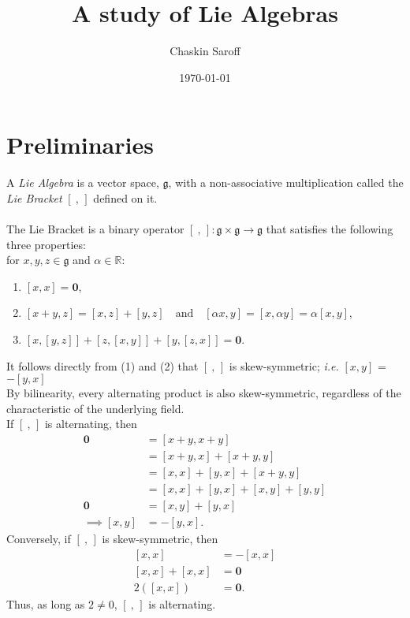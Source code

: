 \documentclass[11 pt]{article}
\title{A study of Lie Algebras}
\author{Chaskin Saroff}
\date{\today}
\renewcommand{\a}{\alpha}
\newcommand{\br}[2]{\left[#1,#2\right]}
\newcommand{\bre}{\br{\ }{\,}}
\newcommand{\fg}{\mathfrak{g}}
\newcommand{\zvec}{\mathbf{0}}
\newcommand{\RR}{\mathbb{R}}
\begin{document}
\maketitle


\section{Preliminaries}

\begin{definition}

    A \emph{Lie Algebra} is a vector space, $\fg$, with a non-associative
    multiplication called the \emph{Lie Bracket} $\bre$ defined on it.
\\
\\The Lie Bracket is a binary operator $ \bre: \fg \times \fg \to \fg$
that satisfies the following three properties:
\\for $x,y,z \in \fg$ and $\a \in \RR$:
\begin{enumerate}
    \item  $\br{x}{x}=\zvec$,

    \item  $\br{x+y}{z} = \br{x}{z}+\br{y}{z}\quad
        \text{and} \quad \br{\a x}{y}=\br{x}{ \a y}=\a\br{x}{y}$,

    \item  $\br{x}{\br{y}{z}} + \br{z}{\br{x}{y}} + \br{y}{\br{z}{x}} = \zvec$.
\end{enumerate}
\end{definition}
It follows directly from (1) and (2) that $\bre$ is skew-symmetric;
\emph{i.e.} $\br{x}{y}$ = $-\br{y}{x}$
\\By bilinearity, every alternating product is also skew-symmetric, regardless
of the characteristic of the underlying field.
\\If $\bre$ is alternating, then
    \begin{align}
        \zvec &= \br{x + y}{x + y}
        \\&= \br{x + y}{x} + \br{x + y}{y}
        \\&= \br{x}{x} + \br{y}{x} + \br{x + y}{y}
        \\&= \br{x}{x} + \br{y}{x} + \br{x}{y} + \br{y}{y}
        \\\zvec&=         \br{x}{y} + \br{y}{x}
        \\\implies \br{x}{y} &= -\br{y}{x}.
    \end{align}
    Conversely, if $\bre$ is skew-symmetric, then
    \begin{align}
        \br{x}{x} &= -\br{x}{x}
        \\ \br{x}{x}+\br{x}{x}&=\zvec
        \\ 2(\br{x}{x})&=\zvec.
    \end{align}
    Thus, as long as $2 \neq 0$, $\bre$ is alternating.
\end{document}
